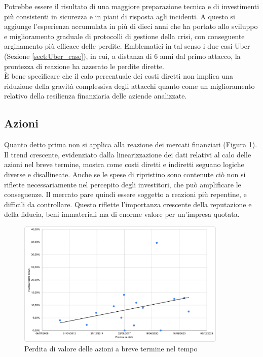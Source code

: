 \documentclass[12pt,a4paper,twoside]{report}
\begin{document}
Potrebbe essere il risultato di una maggiore preparazione tecnica e di investimenti pi\`u 
consistenti in sicurezza e in piani di risposta agli incidenti. A questo si aggiunge l'esperienza accumulata
in pi\`u di dieci anni che ha portato allo sviluppo e miglioramento graduale di protocolli di gestione della
crisi, con conseguente arginamento pi\`u efficace delle perdite. Emblematici in tal senso i due casi Uber (Sezione \ref{sect:Uber_case}), 
in cui, a distanza di 6 anni dal primo attacco, la prontezza di reazione ha azzerato le perdite dirette.\\
\`E bene specificare che il calo percentuale dei costi diretti non implica una riduzione della gravit\`a complessiva degli attacchi
quanto come un miglioramento relativo della resilienza finanziaria delle aziende analizzate.\\

\subsection{Azioni}
Quanto detto prima non si applica alla reazione dei mercati finanziari (Figura \ref{fig:stockloss}).
Il trend crescente, evidenziato dalla linearizzazione dei dati relativi al calo delle azioni nel breve termine,
mostra come costi diretti e indiretti seguano logiche diverse e disallineate. Anche se le spese di ripristino 
sono contenute ci\`o non si riflette necessariamente nel percepito degli investitori, che pu\`o amplificare le conseguenze.
Il mercato pare quindi essere soggetto a reazioni pi\`u repentine, e difficili da controllare. Questo riflette l'importanza 
crescente della reputazione e della fiducia, beni immateriali ma di enorme  valore per un'impresa quotata.

\begin{figure}[H]
    \centering
    \includegraphics[width=10cm]{figures/stocks-date.png}
    \caption{Perdita di valore delle azioni a breve termine nel tempo}
    \label{fig:stockloss}
\end{figure}
\end{document}
